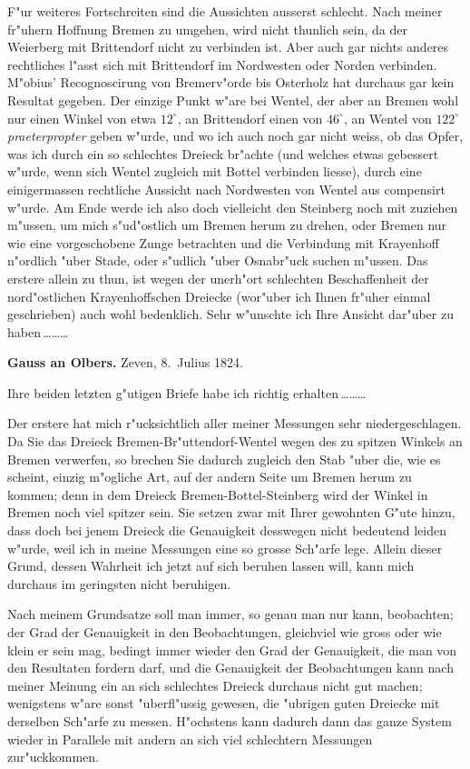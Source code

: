 \documentclass[12pt,a4paper]{article}
\theoremstyle{plain}
\theoremstyle{definition}
\theoremstyle{remark}
\begin{document}
\medskip
\noindent F"ur weiteres Fortschreiten sind die Aussichten ausserst schlecht. Nach meiner fr"uhern Hoffnung Bremen zu umgehen, wird nicht thunlich sein, da der Weierberg mit Brittendorf nicht zu verbinden ist. Aber auch gar nichts anderes rechtliches l"asst sich mit Brittendorf im Nordwesten oder Norden verbinden. M"obius' Recognoscirung von Bremerv"orde bis Osterholz hat durchaus gar kein Resultat gegeben. Der einzige Punkt w"are bei Wentel, der aber an Bremen wohl nur einen Winkel von etwa $12^{\circ}$, an Brittendorf einen von $46^{\circ}$, an Wentel von $122^{\circ}$ \emph{praeterpropter} geben w"urde, und wo ich auch noch gar nicht weiss, ob das Opfer, was ich durch ein so schlechtes Dreieck br"achte (und welches etwas gebessert w"urde, wenn sich Wentel zugleich mit Bottel verbinden liesse), durch eine einigermassen rechtliche Aussicht nach Nordwesten von Wentel aus compensirt w"urde. Am Ende werde ich also doch vielleicht den Steinberg noch mit zuziehen m"ussen, um mich s"ud"ostlich um Bremen herum zu drehen, oder Bremen nur wie eine vorgeschobene Zunge betrachten und die Verbindung mit Krayenhoff n"ordlich "uber Stade, oder s"udlich "uber Osnabr"uck suchen m"ussen. Das erstere allein zu thun, ist wegen der unerh"ort schlechten Beschaffenheit der nord"ostlichen Krayenhoffschen Dreiecke (wor"uber ich Ihnen fr"uher einmal geschrieben) auch wohl bedenklich. Sehr w"unschte ich Ihre Ansicht dar"uber zu haben\,\ldots\ldots\ldots

\medskip
\noindent \textbf{Gauss an Olbers.} Zeven, 8.~Julius 1824.

\medskip
\noindent Ihre beiden letzten g"utigen Briefe habe ich richtig erhalten\,\ldots\ldots\ldots

Der erstere hat mich r"ucksichtlich aller meiner Messungen sehr niedergeschlagen. Da Sie das Dreieck Bremen-Br"uttendorf-Wentel wegen des zu spitzen Winkels an Bremen verwerfen, so brechen Sie dadurch zugleich den Stab "uber die, wie es scheint, einzig m"ogliche Art, auf der andern Seite um Bremen herum zu kommen; denn in dem Dreieck Bremen-Bottel-Steinberg wird der Winkel in Bremen noch viel spitzer sein. Sie setzen zwar mit Ihrer gewohnten G"ute hinzu, dass doch bei jenem Dreieck die Genauigkeit desswegen nicht bedeutend leiden w"urde, weil ich in meine Messungen eine so grosse Sch"arfe lege. Allein dieser Grund, dessen Wahrheit ich jetzt auf sich beruhen lassen will, kann mich durchaus im geringsten nicht beruhigen.

\newpage
\noindent Nach meinem Grundsatze soll man immer, so genau man nur kann, beobachten; der Grad der Genauigkeit in den Beobachtungen, gleichviel wie gross oder wie klein er sein mag, bedingt immer wieder den Grad der Genauigkeit, die man von den Resultaten fordern darf, und die Genauigkeit der Beobachtungen kann nach meiner Meinung ein an sich schlechtes Dreieck durchaus nicht gut machen; wenigstens w"are sonst "uberfl"ussig gewesen, die "ubrigen guten Dreiecke mit derselben Sch"arfe zu messen. H"ochstens kann dadurch dann das ganze System wieder in Parallele mit andern an sich viel schlechtern Messungen zur"uckkommen.
\end{document}
